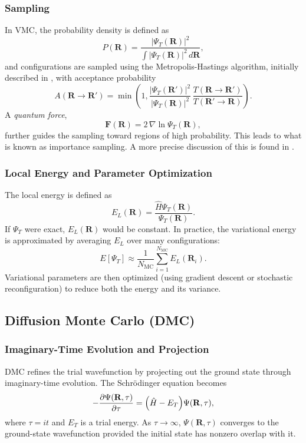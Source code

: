 \subsubsection{Sampling}
In VMC, the probability density is defined as
\[
P(\mathbf{R}) = \frac{|\Psi_T(\mathbf{R})|^2}{\int |\Psi_T(\mathbf{R})|^2\, d\mathbf{R}},
\]
and configurations are sampled using the Metropolis-Hastings algorithm, initially described in \cite{Metropolis1953}, with acceptance probability
\[
A(\mathbf{R} \to \mathbf{R}') = \min\!\left(1, \frac{|\Psi_T(\mathbf{R}')|^2}{|\Psi_T(\mathbf{R})|^2}\, \frac{T(\mathbf{R} \to \mathbf{R}')}{T(\mathbf{R}' \to \mathbf{R})}\right).
\]
A \emph{quantum force},
\[
\mathbf{F}(\mathbf{R}) = 2\, \nabla \ln \Psi_T(\mathbf{R}),
\]
further guides the sampling toward regions of high probability. This leads to what is known as importance sampling. A more precise discussion of this is found in \cite{Chin1990-QuadraticDMC,VanKampen1992-StochasticProcesses}.

\subsubsection{Local Energy and Parameter Optimization}
The local energy is defined as
\[
E_L(\mathbf{R}) = \frac{\hat{H}\Psi_T(\mathbf{R})}{\Psi_T(\mathbf{R})}.
\]
If $\Psi_T$ were exact, $E_L(\mathbf{R})$ would be constant. In practice, the variational energy is approximated by averaging $E_L$ over many configurations:
\[
E[\Psi_T] \approx \frac{1}{N_{\text{MC}}} \sum_{i=1}^{N_{\text{MC}}} E_L(\mathbf{R}_i).
\]
Variational parameters are then optimized (using gradient descent or stochastic reconfiguration) to reduce both the energy and its variance.

\subsection{Diffusion Monte Carlo (DMC)}
\subsubsection{Imaginary-Time Evolution and Projection}
DMC refines the trial wavefunction by projecting out the ground state through imaginary-time evolution. The Schrödinger equation becomes
\[
-\frac{\partial \Psi(\mathbf{R}, \tau)}{\partial \tau} = \Bigl(\hat{H} - E_T\Bigr)\Psi(\mathbf{R}, \tau),
\]
where $\tau = it$ and $E_T$ is a trial energy. As $\tau \to \infty$, $\Psi(\mathbf{R}, \tau)$ converges to the ground-state wavefunction provided the initial state has nonzero overlap with it.

